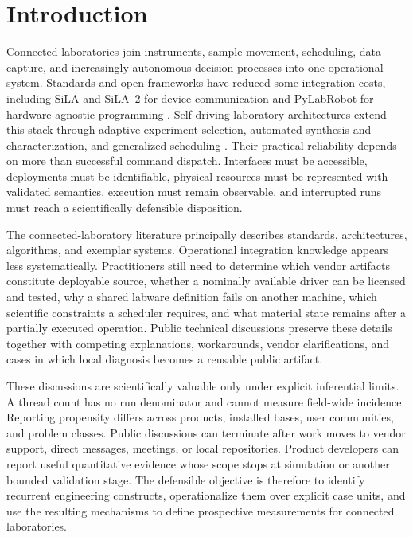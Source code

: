 \section{Introduction}
\label{sec:introduction}

Connected laboratories join instruments, sample movement, scheduling, data capture, and increasingly autonomous decision processes into one operational system. Standards and open frameworks have reduced some integration costs, including SiLA and SiLA~2 for device communication and PyLabRobot for hardware-agnostic programming \cite{bar2012sila,juchli2022sila2,porr2020gateway,bromig2022manager,wierenga2023pylabrobot}. Self-driving laboratory architectures extend this stack through adaptive experiment selection, automated synthesis and characterization, and generalized scheduling \cite{abolhasani2023rise,hung2024community,canty2023autonomy,fei2024alabos,cousty2024glas}. Their practical reliability depends on more than successful command dispatch. Interfaces must be accessible, deployments must be identifiable, physical resources must be represented with validated semantics, execution must remain observable, and interrupted runs must reach a scientifically defensible disposition.

The connected-laboratory literature principally describes standards, architectures, algorithms, and exemplar systems. Operational integration knowledge appears less systematically. Practitioners still need to determine which vendor artifacts constitute deployable source, whether a nominally available driver can be licensed and tested, why a shared labware definition fails on another machine, which scientific constraints a scheduler requires, and what material state remains after a partially executed operation. Public technical discussions preserve these details together with competing explanations, workarounds, vendor clarifications, and cases in which local diagnosis becomes a reusable public artifact.

These discussions are scientifically valuable only under explicit inferential limits. A thread count has no run denominator and cannot measure field-wide incidence. Reporting propensity differs across products, installed bases, user communities, and problem classes. Public discussions can terminate after work moves to vendor support, direct messages, meetings, or local repositories. Product developers can report useful quantitative evidence whose scope stops at simulation or another bounded validation stage. The defensible objective is therefore to identify recurrent engineering constructs, operationalize them over explicit case units, and use the resulting mechanisms to define prospective measurements for connected laboratories.

